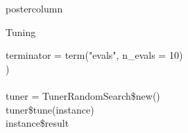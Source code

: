 \documentclass{beamer}
\begin{document}
\begin{frame}[fragile]{}
\begin{columns}
\begin{column}{.245\textwidth}
\begin{beamercolorbox}[center]{postercolumn}
\begin{minipage}{.98\textwidth}
{\begin{myblock}{Tuning}
\begin{codeboxexample}
{                \hspace*{1ex} terminator = term("evals", n\_evals = 10)\\
                ) \\
                \ \\
                tuner = TunerRandomSearch\$new()\\
                tuner\$tune(instance)\\
                instance\$result}
					    \end{codeboxexample}
            \end{myblock}
						\vfill}
				\end{minipage}
			\end{beamercolorbox}
		\end{column}
	\end{columns}
\end{frame}
\end{document}
